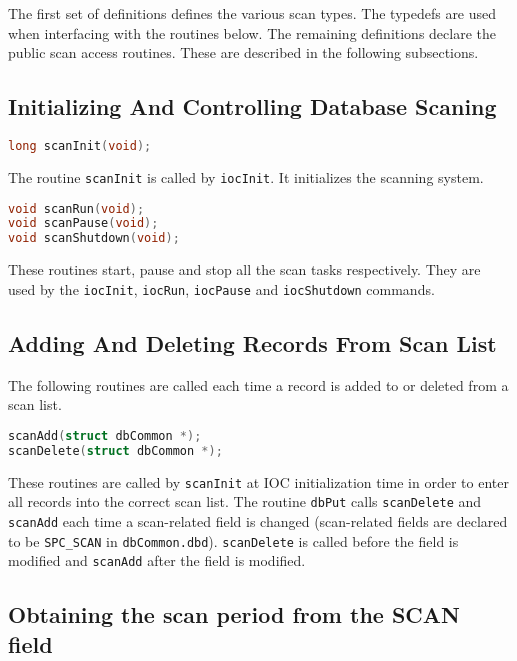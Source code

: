 The first set of definitions defines the various scan types.
The typedefs are used when interfacing with the routines below.
The remaining definitions declare the public scan access routines.
These are described in the following subsections.

\subsection{Initializing And Controlling Database Scaning}

\begin{lstlisting}[language=C]
long scanInit(void);
\end{lstlisting}

The routine \verb|scanInit| is called by \verb|iocInit|.
It initializes the scanning system.

\begin{lstlisting}[language=C]
void scanRun(void);
void scanPause(void);
void scanShutdown(void);
\end{lstlisting}

These routines start, pause and stop all the scan tasks respectively.
They are used by the \verb|iocInit|, \verb|iocRun|, \verb|iocPause| and \verb|iocShutdown| commands.

\subsection{Adding And Deleting Records From Scan List}

The following routines are called each time a record is added to or deleted from a scan list.

\begin{lstlisting}[language=C]
scanAdd(struct dbCommon *);
scanDelete(struct dbCommon *);
\end{lstlisting}

These routines are called by \verb|scanInit| at IOC initialization time in order to enter all records into the correct scan list.
The routine \verb|dbPut| calls \verb|scanDelete| and \verb|scanAdd| each time a scan-related field is changed (scan-related fields are declared to be \verb|SPC_SCAN| in \verb|dbCommon.dbd|).
\verb|scanDelete| is called before the field is modified and \verb|scanAdd| after the field is modified.

\subsection{Obtaining the scan period from the SCAN field}

